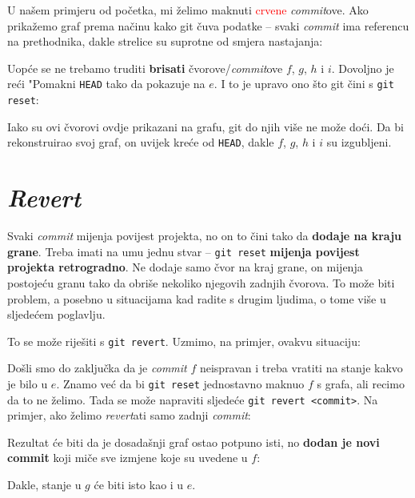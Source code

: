 U našem primjeru od početka, mi želimo maknuti \textcolor{red}{crvene} \emph{commit}ove. 
Ako prikažemo graf prema načinu kako git čuva podatke -- svaki \emph{commit} ima referencu na prethodnika, dakle strelice su suprotne od smjera nastajanja:



Uopće se ne trebamo truditi \textbf{brisati} čvorove/\emph{commit}ove $f$, $g$, $h$ i $i$.
Dovoljno je reći "Pomakni \verb+HEAD+ tako da pokazuje na $e$.
I to je upravo ono što git čini s \verb+git reset+:



Iako su ovi čvorovi ovdje prikazani na grafu, git do njih više ne može doći.
Da bi rekonstruirao svoj graf, on uvijek kreće od \verb+HEAD+, dakle $f$, $g$, $h$ i $i$ su izgubljeni.

\section*{\emph{Revert}}

Svaki \emph{commit} mijenja povijest projekta, no on to čini tako da \textbf{dodaje na kraju grane}.
Treba imati na umu jednu stvar -- \verb+git reset+ \textbf{mijenja povijest projekta retrogradno}.
Ne dodaje samo čvor na kraj grane, on mijenja postojeću granu tako da obriše nekoliko njegovih zadnjih čvorova.
To može biti problem, a posebno u situacijama kad radite s drugim ljudima, o tome više u sljedećem poglavlju.

To se može riješiti s \verb+git revert+. Uzmimo, na primjer, ovakvu situaciju:



Došli smo do zaključka da je \emph{commit} $f$ neispravan i treba vratiti na stanje kakvo je bilo u $e$.
Znamo već da bi \verb+git reset+ jednostavno maknuo $f$ s grafa, ali recimo da to ne želimo.
Tada se može napraviti sljedeće \verb+git revert <commit>+. 
Na primjer, ako želimo \emph{revert}ati samo zadnji \emph{commit}:


Rezultat će biti da je dosadašnji graf ostao potpuno isti, no \textbf{dodan je novi commit} koji miče sve izmjene koje su uvedene u $f$:



Dakle, stanje u $g$ će biti isto kao i u $e$.

